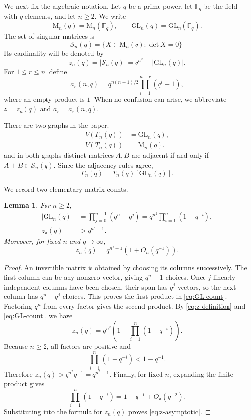 \documentclass[11pt]{article}
\newtheorem{lemma}[theorem]{Lemma}
\theoremstyle{definition}
\newcommand{\F}{\mathbb{F}}
\newcommand{\Mat}{\mathrm{M}}
\newcommand{\GL}{\mathrm{GL}}
\newcommand{\cS}{\mathcal{S}}
\begin{document}
We next fix the algebraic notation.  Let $q$ be a prime power, let $\F_q$
be the field with $q$ elements, and let $n\ge2$.  We write
\[
  \Mat_n(q)=\Mat_n(\F_q),
  \qquad
  \GL_n(q)=\GL_n(\F_q).
\]
The set of singular matrices is
\[
  \cS_n(q)=\{X\in\Mat_n(q):\det X=0\}.
\]
Its cardinality will be denoted by
\begin{equation}\label{eq:z-definition}
  z_n(q)=|\cS_n(q)|=q^{n^2}-|\GL_n(q)|.
\end{equation}
For $1\le r\le n$, define
\begin{equation}\label{eq:a-definition}
  a_r(n,q)=q^{n(n-1)/2}\prod_{i=1}^{n-r}(q^i-1),
\end{equation}
where an empty product is $1$.  When no confusion can arise, we abbreviate
$z=z_n(q)$ and $a_r=a_r(n,q)$.

There are two graphs in the paper.
\begin{align*}
 V(\Gamma_n(q))&=\GL_n(q),\\
 V(T_n(q))&=\Mat_n(q),
\end{align*}
and in both graphs distinct matrices $A,B$ are adjacent if and only if
$A+B\in\cS_n(q)$.  Since the adjacency rules agree,
\begin{equation}\label{eq:induced-subgraph}
  \Gamma_n(q)=T_n(q)[\GL_n(q)].
\end{equation}

We record two elementary matrix counts.

\begin{lemma}\label{lem:matrix-counts}
For $n\ge2$,
\begin{align}
 |\GL_n(q)|
 &=\prod_{j=0}^{n-1}(q^n-q^j)
 =q^{n^2}\prod_{i=1}^{n}(1-q^{-i}),                         \label{eq:GL-count}\\
 z_n(q)&>q^{n^2-1}.                                          \label{eq:z-lower}
\end{align}
Moreover, for fixed $n$ and $q\to\infty$,
\begin{equation}\label{eq:z-asymptotic}
  z_n(q)=q^{n^2-1}(1+O_n(q^{-1})).
\end{equation}
\end{lemma}

\begin{proof}
An invertible matrix is obtained by choosing its columns successively.  The first column can be any nonzero vector, giving $q^n-1$ choices.  Once $j$ linearly independent columns have been chosen, their span has $q^j$ vectors, so the next column has $q^n-q^j$ choices.  This proves the first product in \eqref{eq:GL-count}.  Factoring $q^n$ from every factor gives the second product. By \eqref{eq:z-definition} and \eqref{eq:GL-count}, we have
\[
 z_n(q)=q^{n^2}
 \left(1-\prod_{i=1}^{n}(1-q^{-i})\right).
\]
Because $n\ge2$, all factors are positive and
\[
  \prod_{i=1}^{n}(1-q^{-i})<1-q^{-1}.
\]
Therefore $z_n(q)>q^{n^2}q^{-1}=q^{n^2-1}$. Finally, for fixed $n$, expanding the finite product gives
\[
  \prod_{i=1}^{n}(1-q^{-i})=1-q^{-1}+O_n(q^{-2}).
\]
Substituting into the formula for $z_n(q)$ proves \eqref{eq:z-asymptotic}.
\end{proof}
\end{document}
